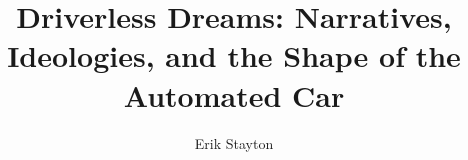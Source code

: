 % 
% 
%
%
%
%
%
%
%
% 
% 

\title{Driverless Dreams: Narratives, Ideologies, and the Shape of the
Automated Car}



\author{Erik Stayton}

